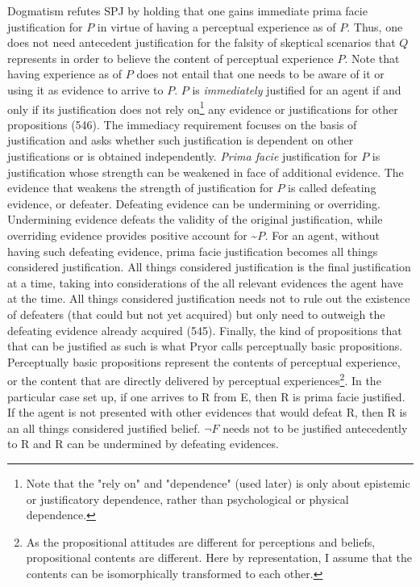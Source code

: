 Dogmatism refutes SPJ by holding that one gains immediate prima facie
justification for \(P\) in virtue of having a perceptual experience as
of \(P\). Thus, one does not need antecedent justification for the
falsity of skeptical scenarios that \(Q\) represents in order to believe
the content of perceptual experience \(P\). Note that having experience
as of \(P\) does not entail that one needs to be aware of it or using it
as evidence to arrive to \(P\). \(P\) is \emph{immediately} justified
for an agent if and only if its justification does not rely on\footnote{Note
  that the "rely on" and "dependence" (used later) is only about
  epistemic or justificatory dependence, rather than psychological or
  physical dependence.} any evidence or justifications for other
propositions (546). The immediacy requirement focuses on the basis of
justification and asks whether such justification is dependent on other
justifications or is obtained independently. \emph{Prima facie}
justification for \(P\) is justification whose strength can be weakened
in face of additional evidence. The evidence that weakens the strength
of justification for \(P\) is called defeating evidence, or defeater.
Defeating evidence can be undermining or overriding. Undermining
evidence defeats the validity of the original justification, while
overriding evidence provides positive account for
\textasciitilde{}\(P\)\emph{.} For an agent, without having such
defeating evidence, prima facie justification becomes all things
considered justification. All things considered justification is the
final justification at a time, taking into considerations of the all
relevant evidences the agent have at the time. All things considered
justification needs not to rule out the existence of defeaters (that
could but not yet acquired) but only need to outweigh the defeating
evidence already acquired (545). Finally, the kind of propositions that
that can be justified as such is what Pryor calls perceptually basic
propositions. Perceptually basic propositions represent the contents of
perceptual experience, or the content that are directly delivered by
perceptual experiences\footnote{As the propositional attitudes are
  different for perceptions and beliefs, propositional contents are
  different. Here by representation, I assume that the contents can be
  isomorphically transformed to each other.}. In the particular case set
up, if one arrives to R from E, then R is prima facie justified. If the
agent is not presented with other evidences that would defeat R, then R
is an all things considered justified belief. $\neg F$ needs
not to be justified antecedently to R and R can be undermined by
defeating evidences.

